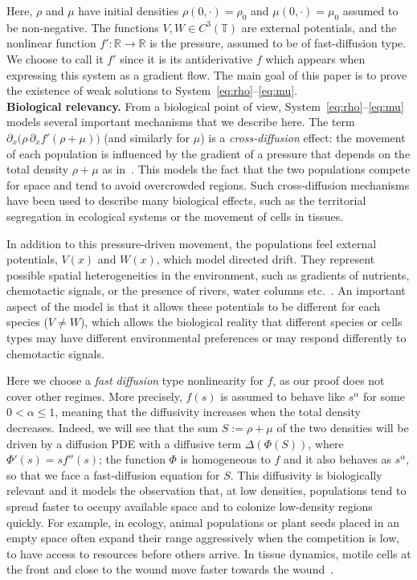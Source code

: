 \documentclass[a4paper,twosided, 11pt]{article}
\newcommand{\R}{\mathbb{R}}
\newcommand {\T}  { {\mathbb{T}} }
\theoremstyle{plain}
\theoremstyle{remark}
\numberwithin{equation}{section}
\begin{document}
Here, $\rho$ and $\mu$ have initial densities $\rho(0,\cdot) = \rho_0$ and $\mu(0,\cdot) = \mu_0$ assumed to be non-negative. The functions $V,W\in C^3(\T)$ are external potentials, and the nonlinear function $f':\R\to\R$ is the pressure, assumed to be of fast-diffusion type. We choose to call it $f'$ since it is its antiderivative $f$
 which appears when expressing this system as a gradient flow. The main goal of this paper is to prove the existence of weak solutions to System~\eqref{eq:rho}--\eqref{eq:mu}.\\

\textbf{Biological relevancy.} From a biological point of view, System~\eqref{eq:rho}--\eqref{eq:mu} models several important mechanisms that we describe here. The term \(\partial_x\bigl(\rho\,\partial_x f'(\rho+\mu)\bigr)\) (and similarly for \(\mu\)) is a \emph{cross-diffusion} effect: the movement of each population is influenced by the gradient of a pressure that depends on the total density \(\rho+\mu\) as in~\cite{MR4072681,David03042023}. This models the fact that the two populations compete for space and tend to avoid overcrowded regions. Such cross-diffusion mechanisms have been used to describe many biological effects, such as the territorial segregation in ecological systems or the movement of cells in tissues.

In addition to this pressure-driven movement, the populations feel external potentials, $V(x)$ and $W(x)$, which model directed drift. They represent possible spatial heterogeneities in the environment, such as gradients of nutrients, chemotactic signals, or the presence of rivers, water columns etc.~\cite{MR1654407,MR1372792,MR2290095,MR1961241,MR2462700,MR3017035,MR2501474}. An important aspect of the model is that it allows these potentials to be different for each species ($V \neq W$), which allows the biological reality that different species or cells types may have different environmental preferences or may respond differently to chemotactic signals.

Here we choose a \emph{fast diffusion} type nonlinearity for \(f\), as our proof does not cover other regimes. More precisely, $f(s)$ is assumed to behave like \(s^\alpha\) for some \(0<\alpha\leq 1\), meaning that the diffusivity increases when the total density decreases. Indeed, we will see that the sum $S:=\rho+\mu$ of the two densities will be driven by a diffusion PDE with a diffusive term $\Delta(\Phi(S))$, where $\Phi'(s)=sf''(s)$; the function $\Phi$ is homogeneous to $f$ and it also behaves as $s^\alpha$, so that we face a fast-diffusion equation for $S$. This diffusivity is biologically relevant and it models the observation that, at low densities, populations tend to spread faster to occupy available space and to colonize low-density regions quickly. For example, in ecology, animal populations or plant seeds placed in an empty space often expand their range aggressively when the competition is low, to have access to resources before others arrive. In tissue dynamics, motile cells at the front and close to the wound move faster towards the wound~\cite{Nikolic2006}. \\
\end{document}
